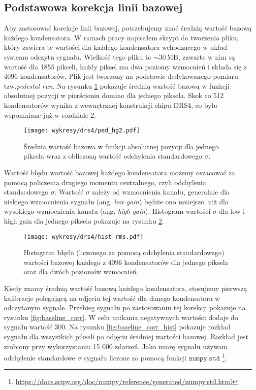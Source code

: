 \documentclass[a4paper,11pt,twoside]{article}
\begin{document}
\subsection{Podstawowa korekcja linii bazowej}
Aby zastosować korekcje linii bazowej, potrzebujemy znać średnią wartość bazową każdego kondensatora. W ramach pracy napisałem skrypt do tworzenia pliku, który zawiera te wartości dla każdego kondensatora wchodzącego w układ systemu odczytu sygnału. Wielkość tego pliku to $\sim 30$\,MB, zawarte w nim są wartość dla 1855 pikseli, każdy piksel ma dwa poziomy wzmocnień i składa się z 4096 kondensatorów. Plik jest tworzony na podstawie dedykowanego pomiaru tzw.\textsl{pedestal run}. Na rysunku \ref{fig:ped_4096} pokazuje średnią wartość bazową w funkcji absolutnej pozycji w pierścieniu domino dla jednego piksela. Skok co 512 kondensatorów wynika z wewnętrznej konstrukcji chipu DRS4, co było wspomniane już w rozdziale 2.
\begin{figure}[H] 
\centering
\texttt{[image: wykresy/drs4/ped\_hg2.pdf]}
\caption{Średnia wartość bazowa w funkcji absolutnej pozycji dla jednego piksela wraz z obliczoną wartość odchylenia standardowego $\sigma$.}
\label{fig:ped_4096}
\end{figure}
Wartość błędu wartość bazowej każdego kondensatora możemy oszacować za pomocą policzenia drugiego momentu centralnego, czyli odchylenia standardowego $\sigma$. 
Wartość $\sigma$ zależy od wzmocnienia kanału, generalnie dla niskiego wzmocnienia sygnału (ang. \textsl{low gain}) będzie ono mniejsze, niż dla wysokiego wzmocnienia kanału (ang. \textsl{high gain}). Histogram wartości $\sigma$ dla low i high gain dla jednego piksela pokazuje na rysunku \ref{fig:hist_rms}.
\begin{figure}[H] 
\centering
\texttt{[image: wykresy/drs4/hist\_rms.pdf]}
\caption{Histogram błędu (liczonego za pomocą odchylenia standardowego) wartości bazowej każdego z 4096 kondensatorów dla jednego piksela oraz dla dwóch poziomów wzmocnień.}
\label{fig:hist_rms}
\end{figure}
\newpage
Kiedy znamy średnią wartość bazową każdego kondensatora, stosujemy pierwszą kalibracje polegającą na odjęciu tej wartość dla danego kondensatora w odczytanym sygnale. Przebieg sygnału po zastosowaniu tej korekcji pokazuje na rysunku \ref{fig:baseline_corr}. W celu unikania negatywnych wartości dodaje do sygnału wartość 300. Na rysunku \ref{fig:baseline_corr_hist} pokazuje rozkład sygnału dla wszystkich pikseli po odjęciu średniej wartości bazowej. Rozkład jest zrobiony przy wykorzystaniu 15 000 zdarzeń. Jako miarę sygnału używam odchylenie standardowe $\sigma$ sygnału liczone za pomocą funkcji $\mathtt{numpy.std}$ \footnote{\url{https://docs.scipy.org/doc/numpy/reference/generated/numpy.std.html}}. 
\end{document}
